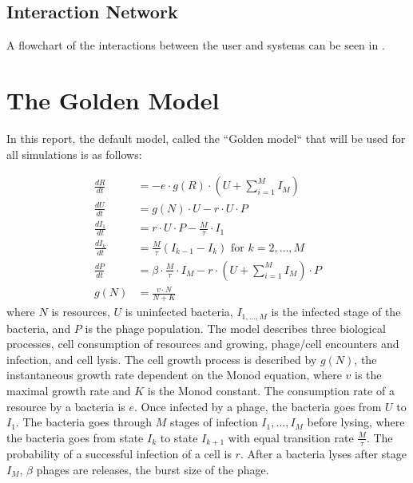 \subsection{Interaction Network}
A flowchart of the interactions between the user and systems can be seen in . 

\section{The Golden Model}
\label{sec:golden_model}
In this report, the default model, called the “Golden model“ \cite{gengUsingBacterialPopulation2024} that will be used for all simulations is as follows:

\begin{align}
    \frac{dR}{dt} &= -e \cdot g(R)\cdot (U + \sum_{i=1}^{M} I_M)\\
    \frac{dU}{dt} &= g(N)\cdot U - r\cdot U \cdot P\\
    \frac{dI_1}{dt} &= r\cdot U \cdot P - \frac{M}{\tau}\cdot I_1 \\
    \frac{dI_k}{dt} &= \frac{M}{\tau}(I_{k-1}-I_k) \text{ for } k=2, \dots, M \\
    \frac{dP}{dt} &= \beta \cdot\frac{M}{\tau} \cdot I_M - r\cdot(U + \sum_{i=1}^{M} I_M)\cdot P \\
    g(N) &= \frac{v\cdot N}{N + K}
\end{align}where $N$ is resources, $U$ is uninfected bacteria, $I_{1, \dots, M}$ is the infected stage of the bacteria, and $P$ is the phage population. \newline
The model describes three biological processes, cell consumption of resources and growing, phage/cell encounters and infection, and cell lysis. 
The cell growth process is described by $g(N)$, the instantaneous growth rate dependent on the Monod equation, where $v$ is the maximal growth rate and $K$ is the Monod constant. 
The consumption rate of a resource by a bacteria is $e$. \newline
Once infected by a phage, the bacteria goes from $U$ to $I_1$. 
The bacteria goes through $M$ stages of infection $I_1, \dots, I_M$ before lysing, where the bacteria goes from state $I_k$ to state $I_{k+1}$ with equal transition rate $\frac{M}{\tau}$. The probability of a successful infection of a cell is $r$. \newline
After a bacteria lyses after stage $I_M$, $\beta$ phages are releases, the burst size of the phage. \newline 

